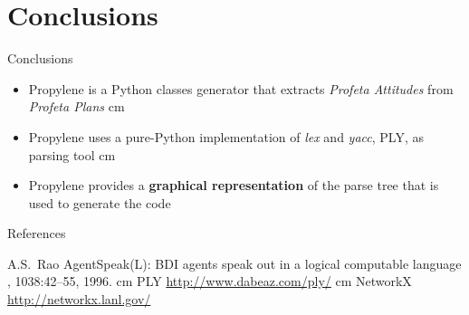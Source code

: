 \documentclass{beamer}
\newcommand{\N}{\vskip 0.3 cm}
\newcommand{\n}{\vskip 0.2 cm}
\newcommand{\red}[1]{\textcolor[rgb]{.8,0,0}{#1}}
\newcommand{\navy}[1]{\textcolor[rgb]{0,0,.5}{#1}}
\begin{document}
\section{Conclusions}
%
\begin{frame}{Conclusions}
  \begin{itemize}
    \item \navy{Propylene} is a Python classes generator that extracts
    \emph{Profeta Attitudes} from \emph{Profeta Plans}
\N
    \item \navy{Propylene} uses a pure-Python implementation of \emph{lex}
    and \emph{yacc}, \red{PLY}, as parsing tool
\N
    \item \navy{Propylene} provides a \textbf{graphical representation} 
    of the parse tree that is used to generate the code
  \end{itemize}
\end{frame}
%

%
\begin{frame}{References}
  \begin{thebibliography}{10}

    \beamertemplatearticlebibitems


      A.S.~Rao
      \newblock AgentSpeak(L): BDI agents speak out in a logical 
      computable language
      , 
      1038:42--55, 1996.
\n    
    \beamertemplatearrowbibitems
      PLY
      \newblock \url{http://www.dabeaz.com/ply/}
\n 
      NetworkX
      \newblock \url{http://networkx.lanl.gov/}
 
    \end{thebibliography}




\end{frame}
%




%
%
\end{document}
